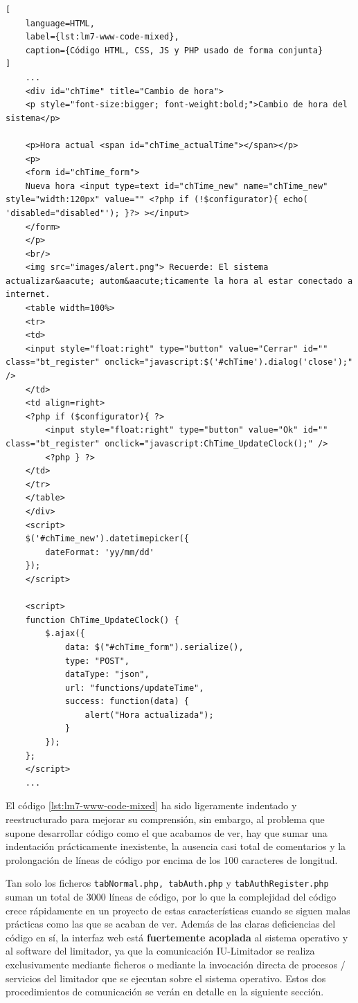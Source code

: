 \begin{lstlisting}[
    language=HTML,
    label={lst:lm7-www-code-mixed},
    caption={Código HTML, CSS, JS y PHP usado de forma conjunta}
]
    ...
    <div id="chTime" title="Cambio de hora">
    <p style="font-size:bigger; font-weight:bold;">Cambio de hora del sistema</p>

    <p>Hora actual <span id="chTime_actualTime"></span></p>
    <p>
    <form id="chTime_form">
    Nueva hora <input type=text id="chTime_new" name="chTime_new" style="width:120px" value="" <?php if (!$configurator){ echo( 'disabled="disabled"'); }?> ></input>
    </form>
    </p>
    <br/>
    <img src="images/alert.png"> Recuerde: El sistema actualizar&aacute; autom&aacute;ticamente la hora al estar conectado a internet.
    <table width=100%>
    <tr>
    <td>
    <input style="float:right" type="button" value="Cerrar" id="" class="bt_register" onclick="javascript:$('#chTime').dialog('close');" />
    </td>
    <td align=right>
    <?php if ($configurator){ ?>
        <input style="float:right" type="button" value="Ok" id="" class="bt_register" onclick="javascript:ChTime_UpdateClock();" />
        <?php } ?>
    </td>
    </tr>
    </table>
    </div>
    <script>
    $('#chTime_new').datetimepicker({
        dateFormat: 'yy/mm/dd'
    });
    </script>

    <script>
    function ChTime_UpdateClock() {
        $.ajax({
            data: $("#chTime_form").serialize(),
            type: "POST",
            dataType: "json",
            url: "functions/updateTime",
            success: function(data) {
                alert("Hora actualizada");
            }
        });
    };
    </script>
    ...
\end{lstlisting}

El código \ref{lst:lm7-www-code-mixed} ha sido ligeramente indentado y reestructurado para mejorar su comprensión, sin embargo, al problema que supone desarrollar código como el que acabamos de ver, hay que sumar una indentación prácticamente inexistente, la ausencia casi total de comentarios y la prolongación de líneas de código por encima de los 100 caracteres de longitud.

Tan solo los ficheros \texttt{tabNormal.php, tabAuth.php} y \texttt{tabAuthRegister.php} suman un total de 3000 líneas de código, por lo que la complejidad del código crece rápidamente en un proyecto de estas características cuando se siguen malas prácticas como las que se acaban de ver. Además de las claras deficiencias del código en sí, la interfaz web está \textbf{fuertemente acoplada} al sistema operativo y al software del limitador, ya que la comunicación IU-Limitador se realiza exclusivamente mediante ficheros o mediante la invocación directa de procesos / servicios del limitador que se ejecutan sobre el sistema operativo. Estos dos procedimientos de comunicación se verán en detalle en la siguiente sección.


